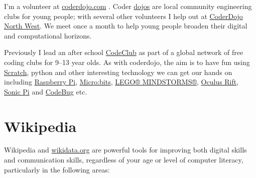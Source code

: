 \documentclass[
  12pt,
]{book}
\begin{document}
I'm a volunteer at \href{https://coderdojo.com/}{coderdojo.com} \citep{coderdojo}. Coder \href{https://en.wikipedia.org/wiki/Dojo}{dojos} are local community engineering clubs for young people; with several other volunteers I help out at \href{https://twitter.com/coderdojonw}{CoderDojo North West}. We meet once a month to help young people broaden their digital and computational horizons.

Previously I lead an after school \href{https://codeclub.org}{CodeClub} as part of a global network of free coding clubs for 9--13 year olds. \citep{codeclub} As with coderdojo, the aim is to have fun using \href{https://scratch.mit.edu/}{Scratch}, \citep{Resnick2009} python and other interesting technology we can get our hands on including \href{https://www.raspberrypi.org/}{Raspberry Pi}, \citep{raspberrypi} \href{https://microbit.org/}{Micro:bits}, \citep{Sentance2017} \href{https://www.lego.com/en-gb/themes/mindstorms}{LEGO® MINDSTORMS®}, \citep{Papert1980, Klassner2003} \href{https://www.oculus.com}{Oculus Rift}, \href{https://sonic-pi.net/}{Sonic Pi} \citep{Aaron2016} and \href{http://www.codebug.org.uk/}{CodeBug} etc.

\section{Wikipedia}\label{wikipedia}

Wikipedia and \href{https://www.wikidata.org}{wikidata.org} \citep{Vrandecic2014, Turki2019} are powerful tools for improving both digital skills and communication skills, regardless of your age or level of computer literacy, \citep{Proffitt2018, goodfaith, Littlejohn2019} particularly in the following areas:
\end{document}
